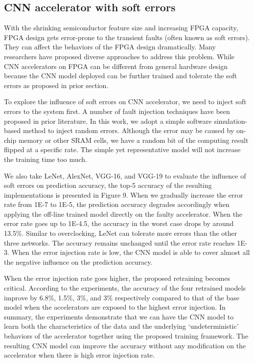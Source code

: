 \subsection{CNN accelerator with soft errors}
  With the shrinking semiconductor feature size and increasing FPGA capacity, 
FPGA design gets error-prone to the transient faults (often known as soft errors). 
They can affect the behaviors of the FPGA design dramatically. Many researchers \cite{Mansour_20,Karim_21,Nidhin_22,Subasi_23,ROSCH_24} 
have proposed diverse approaches to address this problem. While CNN accelerators on FPGA can be different 
from general hardware design because the CNN model deployed can be further trained and tolerate the 
soft errors as proposed in prior section\cite{Tu2018RANA_1}.

  To explore the influence of soft errors on CNN accelerator, we need to inject soft errors to the system first. 
A number of fault injection techniques have been proposed in prior literature. In this work, we adopt 
a simple software simulation- based method to inject random errors. Although the error may be caused by 
on-chip memory or other SRAM cells, we have a random bit of the computing result flipped at a specific rate. 
The simple yet representative model will not increase the training time too much.

  We also take LeNet, AlexNet, VGG-16, and VGG-19 to evaluate the influence of soft errors on prediction accuracy,
the top-5 accuracy of the resulting implementations is presented in Figure 9. When we gradually 
increase the error rate from 1E-7 to 1E-5, the prediction accuracy degrades accordingly when applying the off-line 
trained model directly on the faulty accelerator. When the error rate goes up to 1E-4.5, 
the accuracy in the worst case drops by around 13.5\%. Similar to overclocking, LeNet can tolerate 
more errors than the other three networks. The accuracy remains unchanged until the error rate reaches 1E-3. 
When the error injection rate is low, the CNN model is able to cover almost all the negative influence 
on the prediction accuracy.

  When the error injection rate goes higher, the proposed retraining becomes critical. 
According to the experiments, the accuracy of the four retrained models improve by 6.8\%, 1.5\%, 3\%, and 3\% 
respectively compared to that of the base model when the accelerators are exposed to the highest 
error injection. In summary, the experiments demonstrate that we can have the CNN model to learn 
both the characteristics of the data and the underlying ‘undeterministic’ behaviors of the accelerator 
together using the proposed training framework. The resulting CNN model can improve the accuracy 
without any modification on the accelerator when there is high error injection rate.  

